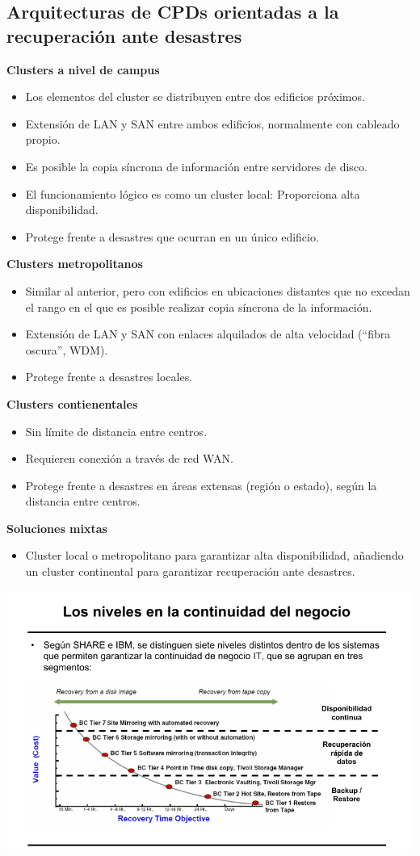 \subsection{Arquitecturas de CPDs orientadas a la recuperación ante desastres}
\textbf{Clusters a nivel de campus}
\begin{itemize}
\item Los elementos del cluster se distribuyen entre dos edificios próximos.
\item Extensión de LAN y SAN entre ambos edificios, normalmente con cableado propio.
\item Es posible la copia síncrona de información entre servidores de disco.
\item El funcionamiento lógico es como un cluster local: Proporciona alta disponibilidad.
\item Protege frente a desastres que ocurran en un único edificio.

\end{itemize}

\textbf{Clusters metropolitanos}
\begin{itemize}
\item Similar al anterior, pero con edificios en ubicaciones distantes que no excedan el rango en el que es posible realizar copia síncrona de la información.
\item Extensión de LAN y SAN con enlaces alquilados de alta velocidad (“fibra oscura”, WDM).
\item Protege frente a desastres locales.

\end{itemize}

\textbf{Clusters contienentales}
\begin{itemize}
\item Sin límite de distancia entre centros.
\item Requieren conexión a través de red WAN.
\item Protege frente a desastres en áreas extensas (región o estado), según la distancia entre centros.

\end{itemize}
\newpage
\textbf{Soluciones mixtas}
\begin{itemize}
\item Cluster local o metropolitano para garantizar alta disponibilidad, añadiendo un cluster continental para garantizar recuperación ante desastres.

\end{itemize}

\begin{center}
\includegraphics[width=\linewidth]{img/continuidad_negocio.png}
\end{center}